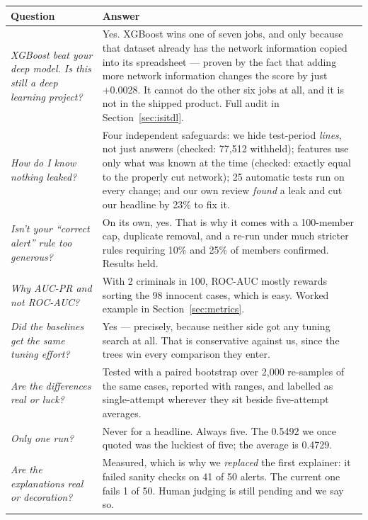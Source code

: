\documentclass[11pt,a4paper]{article}
\begin{document}
\begin{longtable}{@{}p{5.0cm}p{10.5cm}@{}}
\toprule
\textbf{Question} & \textbf{Answer} \\
\midrule
\endhead
\emph{XGBoost beat your deep model. Is this still a deep learning project?} &
Yes. XGBoost wins one of seven jobs, and only because that dataset already has
the network information copied into its spreadsheet --- proven by the fact that
adding more network information changes the score by just +0.0028. It cannot do
the other six jobs at all, and it is not in the shipped product. Full audit in
Section~\ref{sec:isitdl}. \\
\addlinespace
\emph{How do I know nothing leaked?} & Four independent safeguards: we hide
test-period \emph{lines}, not just answers (checked: 77{,}512 withheld); features
use only what was known at the time (checked: exactly equal to the properly cut
network); 25 automatic tests run on every change; and our own review \emph{found}
a leak and cut our headline by 23\% to fix it. \\
\addlinespace
\emph{Isn't your ``correct alert'' rule too generous?} & On its own, yes. That is
why it comes with a 100-member cap, duplicate removal, and a re-run under much
stricter rules requiring 10\% and 25\% of members confirmed. Results held. \\
\addlinespace
\emph{Why AUC-PR and not ROC-AUC?} & With 2 criminals in 100, ROC-AUC mostly
rewards sorting the 98 innocent cases, which is easy. Worked example in
Section~\ref{sec:metrics}. \\
\addlinespace
\emph{Did the baselines get the same tuning effort?} & Yes --- precisely, because
neither side got any tuning search at all. That is conservative against us, since
the trees win every comparison they enter. \\
\addlinespace
\emph{Are the differences real or luck?} & Tested with a paired bootstrap over
2{,}000 re-samples of the same cases, reported with ranges, and labelled as
single-attempt wherever they sit beside five-attempt averages. \\
\addlinespace
\emph{Only one run?} & Never for a headline. Always five. The 0.5492 we once
quoted was the luckiest of five; the average is 0.4729. \\
\addlinespace
\emph{Are the explanations real or decoration?} & Measured, which is why we
\emph{replaced} the first explainer: it failed sanity checks on 41 of 50 alerts.
The current one fails 1 of 50. Human judging is still pending and we say so. \\

\end{longtable}
\end{document}
